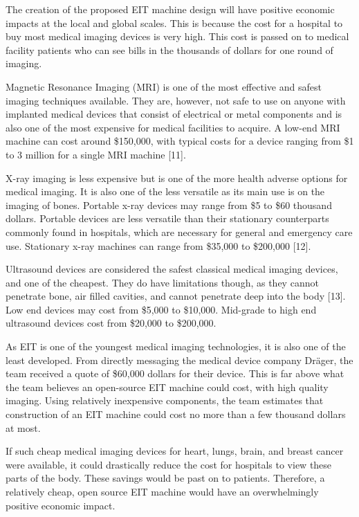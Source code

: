 The creation of the proposed EIT machine design will have positive
economic impacts at the local and global scales. This is because the
cost for a hospital to buy most medical imaging devices is very high.
This cost is passed on to medical facility patients who can see bills in
the thousands of dollars for one round of imaging.

Magnetic Resonance Imaging (MRI) is one of the most effective and safest
imaging techniques available. They are, however, not safe to use on
anyone with implanted medical devices that consist of electrical or
metal components and is also one of the most expensive for medical
facilities to acquire. A low-end MRI machine can cost around \$150,000,
with typical costs for a device ranging from \$1 to 3 million for a
single MRI machine {[}11{]}.

X-ray imaging is less expensive but is one of the more health adverse
options for medical imaging. It is also one of the less versatile as its
main use is on the imaging of bones. Portable x-ray devices may range
from \$5 to \$60 thousand dollars. Portable devices are less versatile
than their stationary counterparts commonly found in hospitals, which
are necessary for general and emergency care use. Stationary x-ray
machines can range from \$35,000 to \$200,000 {[}12{]}.

Ultrasound devices are considered the safest classical medical imaging
devices, and one of the cheapest. They do have limitations though, as
they cannot penetrate bone, air filled cavities, and cannot penetrate
deep into the body {[}13{]}. Low end devices may cost from \$5,000 to
\$10,000. Mid-grade to high end ultrasound devices cost from \$20,000 to
\$200,000.

As EIT is one of the youngest medical imaging technologies, it is also
one of the least developed. From directly messaging the medical device
company Dräger, the team received a quote of \$60,000 dollars for their
device. This is far above what the team believes an open-source EIT
machine could cost, with high quality imaging. Using relatively
inexpensive components, the team estimates that construction of an EIT
machine could cost no more than a few thousand dollars at most.

If such cheap medical imaging devices for heart, lungs, brain, and
breast cancer were available, it could drastically reduce the cost for
hospitals to view these parts of the body. These savings would be past
on to patients. Therefore, a relatively cheap, open source EIT machine
would have an overwhelmingly positive economic impact.

